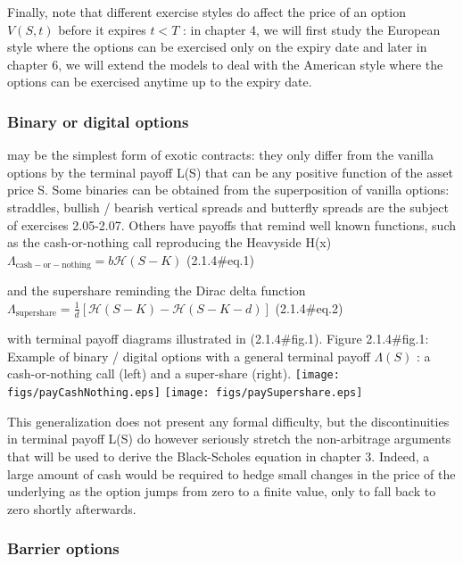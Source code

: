 Finally, note that different exercise styles do affect the price of an option $ V(S,t)$ before it expires $ t<T$ : in chapter 4, we will first study the European style where the options can be exercised only on the expiry date and later in chapter 6, we will extend the models to deal with the American style where the options can be exercised anytime up to the expiry date.



\frametitle{Binary or digital options}

may be the simplest form of exotic contracts: they only differ from the vanilla options by the terminal payoff L(S)   that can be any positive function of the asset price S. Some binaries can be obtained from the superposition of vanilla options: straddles, bullish / bearish vertical spreads and butterfly spreads are the subject of exercises 2.05-2.07. Others have payoffs that remind well known functions, such as the cash-or-nothing call reproducing the Heavyside H(x)
 $\displaystyle \Lambda_\mathrm{cash-or-nothing} =b \mathcal{H}(S-K)$	 (2.1.4#eq.1)


and the supershare reminding the Dirac delta function
 $\displaystyle \Lambda_\mathrm{supershare} =\frac{1}{d}[\mathcal{H}(S-K) -\mathcal{H}(S-K-d)]$	 (2.1.4#eq.2)


with terminal payoff diagrams illustrated in (2.1.4#fig.1).
Figure 2.1.4#fig.1: Example of binary / digital options with a general terminal payoff  $ \Lambda (S)$ : a cash-or-nothing call (left) and a super-share (right).
\texttt{[image: figs/payCashNothing.eps]}        \texttt{[image: figs/paySupershare.eps]}

This generalization does not present any formal difficulty, but the discontinuities in terminal payoff L(S)   do however seriously stretch the non-arbitrage arguments that will be used to derive the Black-Scholes equation in chapter 3. Indeed, a large amount of cash would be required to hedge small changes in the price of the underlying as the option jumps from zero to a finite value, only to fall back to zero shortly afterwards.


\frametitle{Barrier options}

